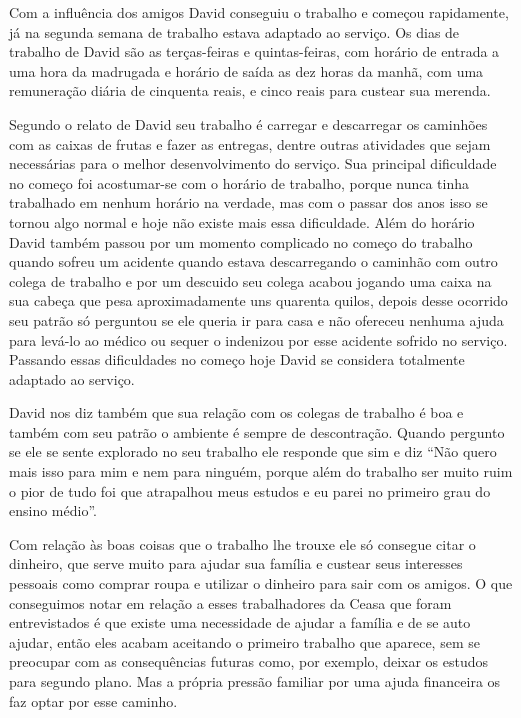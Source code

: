 Com a influência dos amigos David conseguiu o trabalho e começou rapidamente, já na segunda semana de trabalho estava adaptado ao serviço. Os dias de trabalho de David são as terças-feiras e quintas-feiras, com horário de entrada a uma hora da madrugada e horário de saída as dez horas da manhã, com uma remuneração diária de cinquenta reais, e cinco reais para custear sua merenda.

Segundo o relato de David seu trabalho é carregar e descarregar os caminhões com as caixas de frutas e fazer as entregas, dentre outras atividades que sejam necessárias para o melhor desenvolvimento do serviço. Sua principal dificuldade no começo foi acostumar-se com o horário de trabalho, porque nunca tinha trabalhado em nenhum horário na verdade, mas com o passar dos anos isso se tornou algo normal e hoje não existe mais essa dificuldade.
Além do horário David também passou por um momento complicado no começo do trabalho quando sofreu um acidente quando estava descarregando o caminhão com outro colega de trabalho e por um descuido seu colega acabou jogando uma caixa na sua cabeça que pesa aproximadamente uns quarenta quilos, depois desse ocorrido seu patrão só perguntou se ele queria ir para casa e não ofereceu nenhuma ajuda para levá-lo ao médico ou sequer o indenizou por esse acidente sofrido no serviço. Passando essas dificuldades no começo hoje David se considera totalmente adaptado ao serviço.

David nos diz também que sua relação com os colegas de trabalho é boa e também com seu patrão o ambiente é sempre de descontração. Quando pergunto se ele se sente explorado no seu trabalho ele responde que sim e diz ``Não quero mais isso para mim e nem para ninguém, porque além do trabalho ser muito ruim o pior de tudo foi que atrapalhou meus estudos e eu parei no primeiro grau do ensino médio''.

Com relação às boas coisas que o trabalho lhe trouxe ele só consegue citar o dinheiro, que serve muito para ajudar sua família e custear seus interesses pessoais como comprar roupa e utilizar o dinheiro para sair com os amigos.
O que conseguimos notar em relação a esses trabalhadores da Ceasa que foram entrevistados é que existe uma necessidade de ajudar a família e de se auto ajudar, então eles acabam aceitando o primeiro trabalho que aparece, sem se preocupar com as consequências futuras como, por exemplo, deixar os estudos para segundo plano. Mas a própria pressão familiar por uma ajuda financeira os faz optar por esse caminho.

